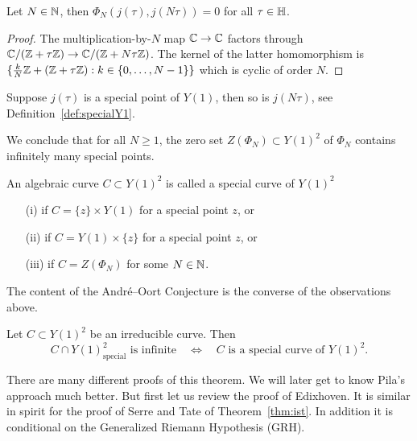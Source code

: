 \begin{lemma}
  Let $N\in{\mathbb{N}}$, then $\Phi_N(j(\tau),j(N\tau))=0$ for all
  $\tau\in{\mathbb{H}}$. 
\end{lemma}
\begin{proof}
  The multiplication-by-$N$ map ${\mathbb{C}}\rightarrow{\mathbb{C}}$ factors through
  ${\mathbb{C}}/({\mathbb{Z}}+\tau{\mathbb{Z}}) \rightarrow {\mathbb{C}}/({\mathbb{Z}}+N\tau{\mathbb{Z}})$.
  The kernel of the latter homomorphism is $\{\frac kN {\mathbb{Z}}
  +({\mathbb{Z}}+\tau{\mathbb{Z}}) : k\in \{0,\ldots,N-1\}\}$ which is cyclic of order
  $N$.  
\end{proof}

Suppose $j(\tau)$ is a special point of $Y(1)$, then so is $j(N\tau)$,
see Definition~\ref{def:specialY1}.

We conclude that for all $N\ge 1$, the zero set $Z(\Phi_N)\subset
Y(1)^2$ of $\Phi_N$ contains infinitely many special points.

\begin{definition}
  An algebraic curve  $C\subset Y(1)^2$ is called a special curve of
  $Y(1)^2$ 
  \begin{enumerate}
  \item [(i)] if $C = \{z\}\times Y(1)$ for a special point $z$, or
\item [(ii)] if $C =  Y(1)\times \{z\}$ for a special point $z$, or
\item[(iii)] if $C=Z(\Phi_N)$ for some $N\in{\mathbb{N}}$. 
\end{enumerate}
\end{definition}

The content of the Andr\'e--Oort Conjecture is the converse of the
observations above.

\begin{theorem}
  \label{thm:ao}
  Let $C\subset Y(1)^2$ be an irreducible curve. Then
  \begin{equation*}
    C \cap Y(1)^2_{\mathrm{special}}\text{ is
      infinite}\quad\Longleftrightarrow\quad \text{$C$ is a special
      curve of $Y(1)^2$}. 
  \end{equation*}  
\end{theorem}

There are many different proofs of this theorem. We will later get to
know Pila's approach much better. But first let us review the proof of
Edixhoven. It is similar in spirit for the proof of Serre and Tate of
Theorem~\ref{thm:ist}. In addition it is conditional on the Generalized
Riemann Hypothesis (GRH).

